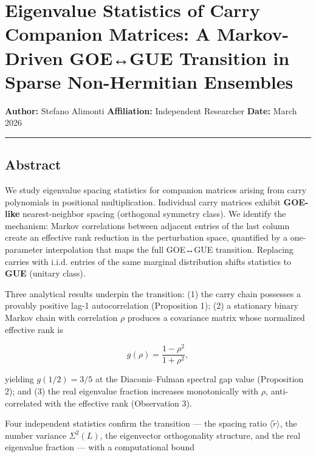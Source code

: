 \documentclass[
  11pt,
]{article}
\author{Stefano Alimonti --- stefalimonti@gmail.com}
\date{March 2026}
\begin{document}
{
\hypersetup{linkcolor=black}
\setcounter{tocdepth}{2}
\tableofcontents
}
\section{Eigenvalue Statistics of Carry Companion Matrices: A Markov-Driven
GOE↔GUE Transition in Sparse Non-Hermitian
Ensembles}\label{eigenvalue-statistics-of-carry-companion-matrices-a-markov-driven-goegue-transition-in-sparse-non-hermitian-ensembles}

\textbf{Author:} Stefano Alimonti \textbf{Affiliation:} Independent Researcher
\textbf{Date:} March 2026

\begin{center}\rule{0.5\linewidth}{0.5pt}\end{center}

\newpage

\subsection{Abstract}\label{abstract}

We study eigenvalue spacing statistics for companion matrices arising from carry
polynomials in positional multiplication. Individual carry matrices exhibit
\textbf{GOE-like} nearest-neighbor spacing (orthogonal symmetry class). We
identify the mechanism: Markov correlations between adjacent entries of the last
column create an effective rank reduction in the perturbation space, quantified
by a one-parameter interpolation that maps the full GOE↔GUE transition.
Replacing carries with i.i.d. entries of the same marginal distribution shifts
statistics to \textbf{GUE} (unitary class).

Three analytical results underpin the transition: (1) the carry chain possesses
a provably positive lag-1 autocorrelation (Proposition 1); (2) a stationary
binary Markov chain with correlation \(\rho\) produces a covariance matrix whose
normalized effective rank is

\[g(\rho) = \frac{1-\rho^2}{1+\rho^2},\]

yielding \(g(1/2) = 3/5\) at the Diaconis--Fulman spectral gap value
(Proposition 2); and (3) the real eigenvalue fraction increases monotonically
with \(\rho\), anti-correlated with the effective rank (Observation 3).

Four independent statistics confirm the transition --- the spacing ratio
\(\langle\tilde{r}\rangle\), the number variance \(\Sigma^2(L)\), the
eigenvector orthogonality structure, and the real eigenvalue fraction --- with a
computational bound
\end{document}
